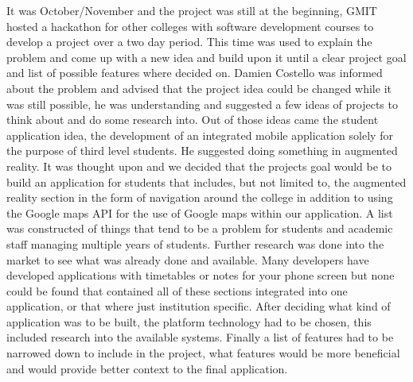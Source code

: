 It was October/November and the project was still at the beginning, GMIT hosted a hackathon for other colleges with software development courses to develop a project over a two day period. This time was used to explain the problem and come up with a new idea and build upon it until a clear project goal and list of possible features where decided on. Damien Costello was informed about the problem and advised that the project idea could be changed while it was still possible, he was understanding and suggested a few ideas of projects to think about and do some research into. Out of those ideas came the student application idea, the development of an integrated mobile application solely for the purpose of third level students. He suggested doing something in augmented reality. It was thought upon and we decided that the projects goal would be to build an application for students that includes, but not limited to, the augmented reality section in the form of navigation around the college in addition to using the Google maps API for the use of Google maps within our application. A list was constructed of things that tend to be a problem for students and academic staff managing multiple years of students. Further research was done into the market to see what was already done and available. Many developers have developed applications with timetables or notes for your phone screen but none could be found that contained all of these sections integrated into one application, or that where just institution specific. After deciding what kind of application was to be built, the platform technology had to be chosen, this included research into the available systems. Finally a list of features had to be narrowed down to include in the project, what features would be more beneficial and would provide better context to the final application.

